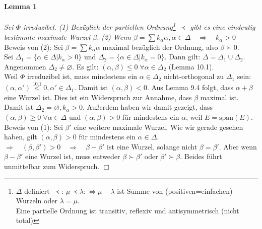 \documentclass[a4paper,12pt]{article}
\begin{document}
\paragraph{Lemma 1} \emph{Sei $\Phi$ irreduzibel. (1) Bezüglich der partiellen Ordnung\footnote{$\Delta$ definiert $\prec$: $\mu \prec \lambda :\Leftrightarrow \mu -\lambda$ ist Summe von (positiven=einfachen) Wurzeln oder $\lambda= \mu$.\\Eine partielle Ordnung ist transitiv, reflexiv und antisymmetrisch (nicht total)}
 $\prec$ gibt es eine eindeutig bestimmte maximale Wurzel $\beta$. (2) Wenn $\beta = \sum k_\alpha \alpha, \alpha \in \Delta \quad \Rightarrow \quad k_\alpha>0$}\\
Beweis von (2): Sei $\beta = \sum k_\alpha \alpha$ maximal bezüglich der Ordnung, also $\beta \succ 0$.\\
Sei $\Delta_1 = \{ \alpha \in \Delta | k_\alpha >0 \}$ und $\Delta_2 = \{ \alpha \in \Delta | k_\alpha = 0 \}$. Dann gilt: $\Delta = \Delta_1 \cup \Delta_2$.\\
Angenommen $\Delta_2 \neq \varnothing$. Es gilt: $(\alpha,\beta) \leq 0\; \forall \alpha\in\Delta_2$ (Lemma 10.1).\\
Weil $\Phi$ irreduzibel ist, muss mindestens ein $\alpha \in\Delta_2$ nicht-orthogonal zu $\Delta_1$ sein: $(\alpha,\alpha') \overset{\text{10.1}}{<} 0 , \alpha'\in\Delta_1$. Damit ist $(\alpha,\beta) <0$. Aus Lemma 9.4 folgt, dass $\alpha+\beta$ eine Wurzel ist. Dies ist ein Widerspruch zur Annahme, dass $\beta$ maximal ist. Damit ist $\Delta_2 = \varnothing, k_\alpha>0$. Außerdem haben wir damit gezeigt, dass $(\alpha,\beta) \geq 0\;\forall \alpha\in\Delta$ und $(\alpha,\beta)>0$ für mindestens ein $\alpha$, weil $E = \text{span}(E)$.\\
Beweis von (1): Sei $\beta'$ eine weitere maximale Wurzel. Wie wir gerade gesehen haben, gilt $(\alpha,\beta)>0$ für mindestens ein $\alpha\in\Delta$.\\
 $\Rightarrow\quad (\beta,\beta')>0 \quad \Rightarrow\quad \beta-\beta'$ ist eine Wurzel, solange nicht $\beta= \beta'$. Aber wenn $\beta-\beta'$ eine Wurzel ist, muss entweder $\beta \succ \beta'$ oder $\beta' \succ \beta$. Beides führt unmittelbar zum Widerspruch.
 \hfill$\Box$
\end{document}
